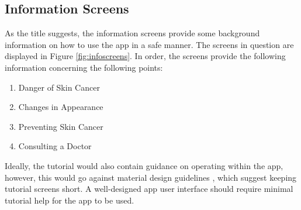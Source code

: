 \subsection{Information Screens} \label{sec:infoscreens}
As the title suggests, the information screens provide some background information on how to use the app in a safe manner. The screens in question are displayed in Figure \ref{fig:infoscreens}. In order, the screens provide the following information concerning the following points:
\begin{enumerate}
    \item Danger of Skin Cancer
    \item Changes in Appearance
    \item Preventing Skin Cancer
    \item Consulting a Doctor
\end{enumerate}

Ideally, the tutorial would also contain guidance on operating within the app, however, this would go against material design guidelines \cite{onboarding}, which suggest keeping tutorial screens short. A well-designed app user interface should require minimal tutorial help for the app to be used.

